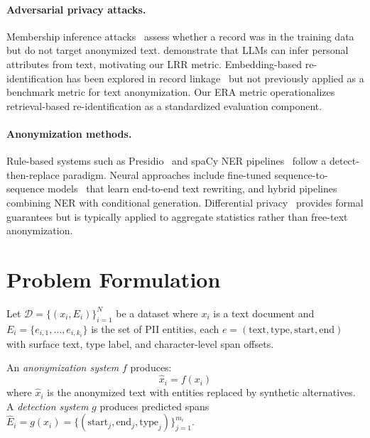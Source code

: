 \documentclass[10pt,twocolumn]{article}
\begin{document}
\paragraph{Adversarial privacy attacks.}
Membership inference attacks~\citep{shokri2017} assess whether a record was in the training data but do not target anonymized text.
\citet{staab2024} demonstrate that LLMs can infer personal attributes from text, motivating our LRR metric.
Embedding-based re-identification has been explored in record linkage~\citep{narayanan2008} but not previously applied as a benchmark metric for text anonymization.
Our ERA metric operationalizes retrieval-based re-identification as a standardized evaluation component.

\paragraph{Anonymization methods.}
Rule-based systems such as Presidio~\citep{presidio2023} and spaCy NER pipelines~\citep{spacy2020} follow a detect-then-replace paradigm.
Neural approaches include fine-tuned sequence-to-sequence models~\citep{lewis2020bart,raffel2020t5} that learn end-to-end text rewriting, and hybrid pipelines combining NER with conditional generation.
Differential privacy~\citep{dwork2006} provides formal guarantees but is typically applied to aggregate statistics rather than free-text anonymization.

\section{Problem Formulation}\label{sec:formulation}

Let $\mathcal{D} = \{(x_i, E_i)\}_{i=1}^{N}$ be a dataset where $x_i$ is a text document and $E_i = \{e_{i,1}, \ldots, e_{i,k_i}\}$ is the set of PII entities, each $e = (\text{text}, \text{type}, \text{start}, \text{end})$ with surface text, type label, and character-level span offsets.

An \emph{anonymization system} $f$ produces:
\begin{equation}
  \hat{x}_i = f(x_i)
\end{equation}
where $\hat{x}_i$ is the anonymized text with entities replaced by synthetic alternatives.
A \emph{detection system} $g$ produces predicted spans $\hat{E}_i = g(x_i) = \{(\text{start}_j, \text{end}_j, \text{type}_j)\}_{j=1}^{m_i}$.
\end{document}
